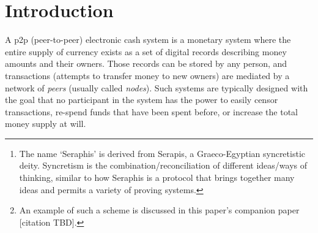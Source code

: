 \begin{abstract}
    Seraphis\footnote{The name `Seraphis' is derived from Serapis, a Graeco-Egyptian syncretistic deity. Syncretism is the combination/reconciliation of different ideas/ways of thinking, similar to how Seraphis is a protocol that brings together many ideas and permits a variety of proving systems.} is a privacy-focused transaction protocol abstraction for p2p electronic cash systems. Seraphis transaction outputs, called {\em e-notes} in this paper, are amount-transfer devices in the RingCT tradition, which record an `amount' as a Pedersen commitment and an `address with transfer-authority' as a specially-designed prime-order group point (similar to CryptoNote one-time addresses). Unlike previous protocols compatible with Confidential Transactions (CT), where enote membership, ownership, and unspentness proofs were highly integrated into one large proving structure (such as MLSAG or CLSAG in the case of standard RingCT), Seraphis separates membership proofs from ownership and unspentness proofs. This greatly simplifies the requirements for membership proofs, allowing more efficient proving structures to be used. Doing so also allows a linking tag (a.k.a.\ key image) construction with a number of favorable properties. Most notably, it is possible to have a Seraphis-compatible addressing scheme which permits wallets with three tiers of permissions (view received amounts, full balance recovery, full balance recovery with spend authority). The second permission tier is unique to Seraphis among protocols in the CryptoNote tradition.\footnote{An example of such a scheme is discussed in this paper's companion paper [citation TBD].}
\end{abstract}


\section{Introduction}
\label{sec:introduction}

A p2p (peer-to-peer) electronic cash system is a monetary system where the entire supply of currency exists as a set of digital records describing money amounts and their owners. Those records can be stored by any person, and transactions (attempts to transfer money to new owners) are mediated by a network of {\em peers} (usually called {\em nodes}). Such systems are typically designed with the goal that no participant in the system has the power to easily censor transactions, re-spend funds that have been spent before, or increase the total money supply at will.

